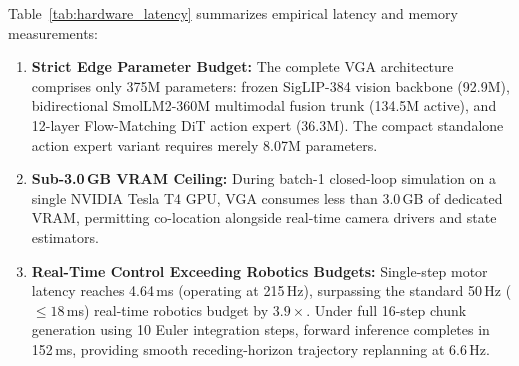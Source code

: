 \begin{table}[t]
\centering
\caption{Inference latency, memory footprint, and parameter budget comparison on consumer edge hardware (NVIDIA Tesla T4 / RTX 4060).}
\label{tab:hardware_latency}
\end{table}

Table~\ref{tab:hardware_latency} summarizes empirical latency and memory measurements:
\begin{enumerate}
    \item \textbf{Strict Edge Parameter Budget:} The complete VGA architecture comprises only 375M parameters: frozen SigLIP-384 vision backbone (92.9M), bidirectional SmolLM2-360M multimodal fusion trunk (134.5M active), and 12-layer Flow-Matching DiT action expert (36.3M). The compact standalone action expert variant requires merely 8.07M parameters.
    \item \textbf{Sub-3.0\,GB VRAM Ceiling:} During batch-1 closed-loop simulation on a single NVIDIA Tesla T4 GPU, VGA consumes less than 3.0\,GB of dedicated VRAM, permitting co-location alongside real-time camera drivers and state estimators.
    \item \textbf{Real-Time Control Exceeding Robotics Budgets:} Single-step motor latency reaches 4.64\,ms (operating at 215\,Hz), surpassing the standard 50\,Hz ($\le 18$\,ms) real-time robotics budget by $3.9\times$. Under full 16-step chunk generation using 10 Euler integration steps, forward inference completes in 152\,ms, providing smooth receding-horizon trajectory replanning at 6.6\,Hz.
\end{enumerate}
